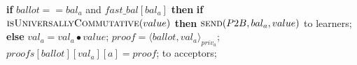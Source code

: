 \begin{algorithm}
\begin{algorithmic}[1]
		\State
		\State \textbf{if} $ballot == bal_a$ and $fast\_bal[bal_a]$ \textbf{then}
		\State \hspace{\algorithmicindent} \textbf{if} $\Call{isUniversallyCommutative}{value}$ \textbf{then}
		\State \hspace{\algorithmicindent}\hspace{\algorithmicindent} $\Call{send}{P2B,bal_a, value}$ to learners;
		\State \hspace{\algorithmicindent} \textbf{else}
		\State \hspace{\algorithmicindent}\hspace{\algorithmicindent} $val_a = val_a \bullet value$;
		\State \hspace{\algorithmicindent}\hspace{\algorithmicindent} $proof = \langle ballot, val_a \rangle_{priv_a}$;
		\State \hspace{\algorithmicindent}\hspace{\algorithmicindent} $proofs[ballot][val_a][a] = proof$;
		\State \hspace{\algorithmicindent}\hspace{\algorithmicindent}  to acceptors;
		\EndFunction
	\end{algorithmic}
\end{algorithm}

